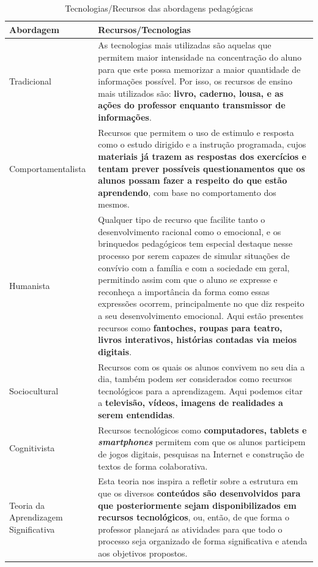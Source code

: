 \begin{table}[htbp]
\caption{Tecnologias/Recursos das abordagens pedagógicas}
\label{tab:abordagens-pedagogicas:tecnologia}
\begin{tabularx}{\textwidth}{p{3.5cm}|X} \hline
\textbf{Abordagem} & \textbf{Recursos/Tecnologias} \\ \hline
Tradicional & As tecnologias mais utilizadas são aquelas que permitem maior intensidade na concentração do aluno para que este possa memorizar a maior quantidade de informações possível. Por isso, os recursos de ensino mais utilizados são: \textbf{livro, caderno, lousa, e as ações do professor enquanto transmissor de informações}. \\ \hline
Comportamentalista & Recursos que permitem o uso de estimulo e resposta como o estudo dirigido e a instrução programada, cujos \textbf{materiais já trazem as respostas dos exercícios e tentam prever possíveis questionamentos que os alunos possam fazer a respeito do que estão aprendendo}, com base no comportamento dos mesmos. \\ \hline
Humanista & Qualquer tipo de recurso que facilite tanto o desenvolvimento racional como o emocional, e os brinquedos pedagógicos tem especial destaque nesse processo por serem capazes de simular situações de convívio com a família e com a sociedade em geral, permitindo assim com que o aluno se expresse e reconheça a importância da forma como essas expressões ocorrem, principalmente no que diz respeito a seu desenvolvimento emocional. Aqui estão presentes recursos como \textbf{fantoches, roupas para teatro, livros interativos, histórias contadas via meios digitais}. \\ \hline
Sociocultural & Recursos com os quais os alunos convivem no seu dia a dia, também podem ser considerados como recursos tecnológicos para a aprendizagem. Aqui podemos citar a \textbf{televisão, vídeos, imagens de realidades a serem entendidas}. \\ \hline
Cognitivista & Recursos tecnológicos como \textbf{computadores, tablets e \textit{smartphones}} permitem com que os alunos participem de jogos digitais, pesquisas na Internet e construção de textos de forma colaborativa. \\ \hline
Teoria da Aprendizagem Significativa & Esta teoria nos inspira a refletir sobre a estrutura em que os diversos \textbf{conteúdos são desenvolvidos para que posteriormente sejam disponibilizados em recursos tecnológicos}, ou, então, de que forma o professor planejará as atividades para que todo o processo seja organizado de forma significativa e atenda aos objetivos propostos. \\ \hline

\end{tabularx}
\end{table}
